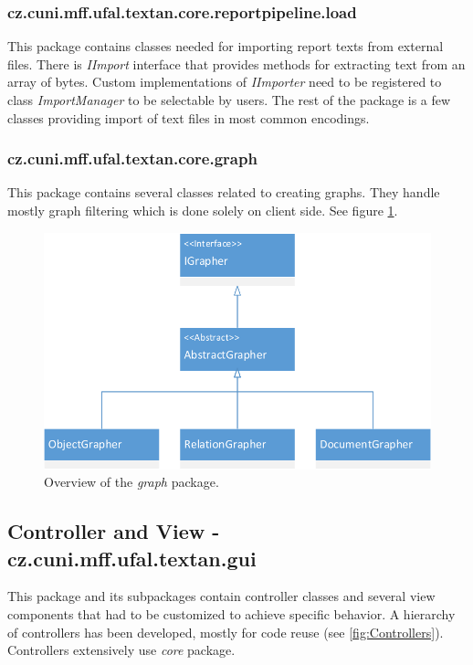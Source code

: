 \subsubsection{cz.cuni.mff.ufal.textan.core.reportpipeline.load}

This package contains classes needed for importing report texts from external
files. There is \emph{IImport} interface that provides methods for extracting
text from an array of bytes. Custom implementations of \emph{IImporter} need
to be registered to class \emph{ImportManager} to be selectable by users. The
rest of the package is a few classes providing import of text files in most
common encodings.

\subsubsection{cz.cuni.mff.ufal.textan.core.graph}

This package contains several classes related to creating graphs. They handle
mostly graph filtering which is done solely on client side. See figure
\ref{fig:Graph}.

\begin{figure}[!htb]
        \centering
        \includegraphics[width=\textwidth]{Images/Graph}
        \caption{Overview of the \emph{graph} package.}
        \label{fig:Graph}
\end{figure}

\subsection{Controller and View - cz.cuni.mff.ufal.textan.gui}

This package and its subpackages contain controller classes and several view
components that had to be customized to achieve specific behavior. A hierarchy
of controllers has been developed, mostly for code reuse (see
\ref{fig:Controllers}). Controllers extensively use \emph{core} package.

